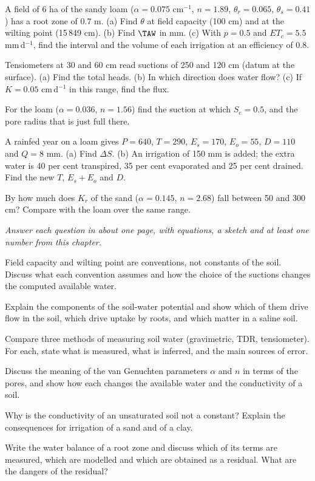 \begin{exlist}
\item A field of 6 ha of the sandy loam ($\alpha=0.075$ cm$^{-1}$, $n=1.89$, $\theta_r=0.065$, $\theta_s=0.41$) has a root zone of 0.7 m. (a) Find $\theta$ at field capacity (100 cm) and at the wilting point (15\,849 cm). (b) Find $\TAW$ in mm. (c) With $p=0.5$ and $ET_c=5.5$ mm\,d$^{-1}$, find the interval and the volume of each irrigation at an efficiency of 0.8.
\item Tensiometers at 30 and 60 cm read suctions of 250 and 120 cm (datum at the surface). (a) Find the total heads. (b) In which direction does water flow? (c) If $K=0.05$ cm\,d$^{-1}$ in this range, find the flux.
\item For the loam ($\alpha=0.036$, $n=1.56$) find the suction at which $S_e=0.5$, and the pore radius that is just full there.
\item A rainfed year on a loam gives $P=640$, $T=290$, $E_s=170$, $E_o=55$, $D=110$ and $Q=8$ mm. (a) Find $\Delta S$. (b) An irrigation of 150 mm is added; the extra water is 40 per cent transpired, 35 per cent evaporated and 25 per cent drained. Find the new $T$, $E_s+E_o$ and $D$.
\item By how much does $K_r$ of the sand ($\alpha=0.145$, $n=2.68$) fall between 50 and 300 cm? Compare with the loam over the same range.
\end{exlist}
{\small\itshape Answer each question in about one page, with equations, a sketch and at least one number from this chapter.}\par\vspace{3pt}
\begin{exlist}
\item Field capacity and wilting point are conventions, not constants of the soil. Discuss what each convention assumes and how the choice of the suctions changes the computed available water.
\item Explain the components of the soil-water potential and show which of them drive flow in the soil, which drive uptake by roots, and which matter in a saline soil.
\item Compare three methods of measuring soil water (gravimetric, TDR, tensiometer). For each, state what is measured, what is inferred, and the main sources of error.
\item Discuss the meaning of the van Genuchten parameters $\alpha$ and $n$ in terms of the pores, and show how each changes the available water and the conductivity of a soil.
\item Why is the conductivity of an unsaturated soil not a constant? Explain the consequences for irrigation of a sand and of a clay.
\item Write the water balance of a root zone and discuss which of its terms are measured, which are modelled and which are obtained as a residual. What are the dangers of the residual?
\end{exlist}
